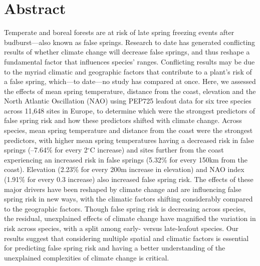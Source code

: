 \documentclass{article}\usepackage[]{graphicx}\usepackage[]{color}
\begin{document}
\section*{Abstract} %
Temperate and boreal forests are at risk of late spring freezing events after budburst---also known as false springs. Research to date has generated conflicting results of whether climate change will decrease false springs, and thus reshape a fundamental factor that influences species' ranges. Conflicting results may be due to the myriad climatic and geographic factors that contribute to a plant's risk of a false spring, which---to date---no study has compared at once. Here, we assessed the effects of mean spring temperature, distance from the coast, elevation and the North Atlantic Oscillation (NAO) using PEP725 leafout data for six tree species across 11,648 sites in Europe, to determine which were the strongest predictors of false spring risk and how these predictors shifted with climate change. Across species, mean spring temperature and distance from the coast were the strongest predictors, with higher mean spring temperatures having a decreased risk in false springs (--7.64\% for every 2$^{\circ}$C increase) and sites further from the coast experiencing an increased risk in false springs (5.32\% for every 150km from the coast). Elevation (2.23\% for every 200m increase in elevation) and NAO index (1.91\% for every 0.3 increase) also increased false spring risk. The effects of these major drivers have been reshaped by climate change and are influencing false spring risk in new ways, with the climatic factors shifting considerably compared to the geographic factors. Though false spring risk is decreasing across species, the residual, unexplained effects of climate change have magnified the variation in risk across species, with a split among early- versus late-leafout species. Our results suggest that considering multiple spatial and climatic factors is essential for predicting false spring risk and having a better understanding of the unexplained complexities of climate change is critical.
\end{document}
